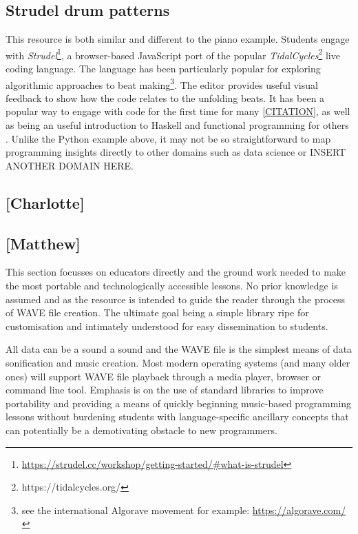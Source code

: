 \subsection{Strudel drum patterns}
This resource is both similar and different to the piano example. Students engage with \emph{Strudel}\footnote{\url{https://strudel.cc/workshop/getting-started/\#what-is-strudel}}, a browser-based JavaScript port of the popular \emph{TidalCycles}\footnote{https://tidalcycles.org/} live coding language. The language has been particularly popular for exploring algorithmic approaches to beat making\footnote{see the international Algorave movement for example: \url{https://algorave.com/}}. The editor provides useful visual feedback to show how the code relates to the unfolding beats. It has been a popular way to engage with code for the first time for many \ref{CITATION}, as well as being an useful introduction to Haskell and functional programming for others \cite{CITATION}. Unlike the Python example above, it may not be so straightforward to map programming insights directly to other domains such as data science or INSERT ANOTHER DOMAIN HERE.

\subsection{[Charlotte]}
% 

\subsection{[Matthew]}
This section focusses on educators directly and the ground work needed to make the most portable and technologically accessible lessons. No prior knowledge is assumed and as the resource is intended to guide the reader through the process of WAVE file creation. The ultimate goal being a simple library ripe for customisation and intimately understood for easy dissemination to students.

All data can be a sound a sound and the WAVE file is the simplest means of data sonification and music creation. Most modern operating systems (and many older ones) will support WAVE file playback through a media player, browser or command line tool. Emphasis is on the use of standard libraries to improve portability and providing a means of quickly beginning music-based programming lessons without burdening students with language-specific ancillary concepts that can potentially be a demotivating obstacle to new programmers.

